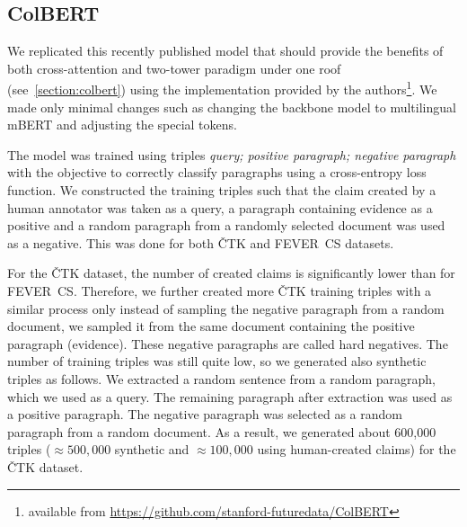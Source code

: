 \subsection{ColBERT}
\label{sub:prop-colbert}
    We replicated this recently published model that should provide the benefits of both cross-attention and two-tower paradigm under one roof (see~\ref{section:colbert}) using 
    the implementation provided by the authors\footnote{available from \url{https://github.com/stanford-futuredata/ColBERT}}. We made only minimal changes such as changing the backbone model to multilingual mBERT and adjusting the special tokens.

    The model was trained using triples \emph{query; positive paragraph; negative paragraph} with the objective to correctly classify paragraphs using a cross-entropy loss function. We constructed the training triples such that the claim created by a human annotator was taken as a query, a paragraph containing evidence as a positive and a random paragraph from a randomly selected document was used as a negative. This was done for both ČTK and FEVER~CS datasets. 
    
    For the ČTK dataset, the number of created claims is significantly lower than for FEVER~CS. Therefore, we further created more ČTK training triples with a similar process only instead of sampling the negative paragraph from a random document, we sampled it from the same document containing the positive paragraph (evidence). These negative paragraphs are called hard negatives. The number of training triples was still quite low, so we generated also synthetic triples as follows. We extracted a random sentence from a random paragraph, which we used as a query. The remaining paragraph after extraction was used as a positive paragraph. The negative paragraph was selected as a random paragraph from a random document. As a result, we generated about 600,000 triples ($\approx{500,000}$ synthetic and $\approx{100,000}$ using human-created claims) for the ČTK dataset.



